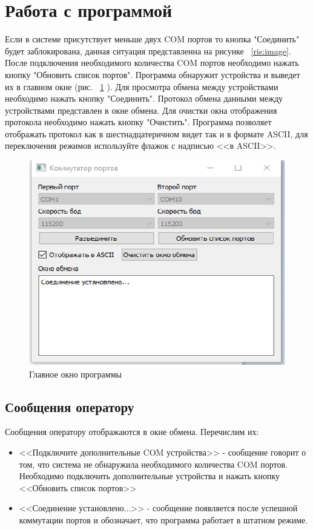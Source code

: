 \documentclass[12pt]{article}[a4paper,14pt,russian]
\begin{document}
\section{Работа с программой}
Если в системе присутствует меньше двух COM портов то кнопка "Соединить" будет заблокирована, данная ситуация представленна на рисунке ~\ref{ris:image}. После подключения необходимого количества COM портов необходимо нажать кнопку "Обновить список портов". Программа обнаружит устройства и выведет их в главном окне (рис. ~\ref{ris:connected} ). Для просмотра обмена между устройствами необходимо нажать кнопку "Соединить". Протокол обмена данными между устройствами представлен в окне обмена. Для очистки окна отображения протокола необходимо нажать кнопку "Очистить". Программа позволяет отображать протокол как в шестнадцатеричном видет так и в формате ASCII, для переключения режимов используйте флажок с надписью <<в ASCII>>.
\begin{figure}
	\includegraphics [scale=0.8]{Connected.png}
	\caption{Главное окно программы}
	\label{ris:connected}
\end{figure}
\subsection{Сообщения оператору}
Сообщения оператору отображаются в окне обмена. Перечислим их:
\begin{itemize}
\item <<Подключите дополнительные COM устройства>> - сообщение говорит о том, что система не обнаружила необходимого количества 
COM портов. Необходимо подключить дополнительные устройства и нажать кнопку <<Обновить список портов>>
\item  <<Соединение установлено...>> - сообщение появляется после успешной коммутации портов и обозначает, что программа работает в штатном режиме.
\end{itemize}
\end{document}
